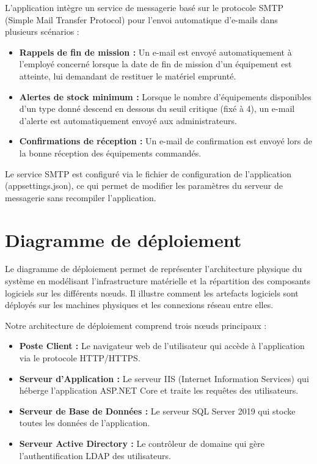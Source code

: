 L'application intègre un service de messagerie basé sur le protocole SMTP (Simple Mail Transfer Protocol) pour l'envoi automatique d'e-mails dans plusieurs scénarios :

\begin{itemize}[label=\textbullet,font=\normalsize]
    \item \textbf{Rappels de fin de mission :} Un e-mail est envoyé automatiquement à l'employé concerné lorsque la date de fin de mission d'un équipement est atteinte, lui demandant de restituer le matériel emprunté.
    \item \textbf{Alertes de stock minimum :} Lorsque le nombre d'équipements disponibles d'un type donné descend en dessous du seuil critique (fixé à 4), un e-mail d'alerte est automatiquement envoyé aux administrateurs.
    \item \textbf{Confirmations de réception :} Un e-mail de confirmation est envoyé lors de la bonne réception des équipements commandés.
\end{itemize}

Le service SMTP est configuré via le fichier de configuration de l'application (appsettings.json), ce qui permet de modifier les paramètres du serveur de messagerie sans recompiler l'application.

\section{Diagramme de déploiement}

Le diagramme de déploiement permet de représenter l'architecture physique du système en modélisant l'infrastructure matérielle et la répartition des composants logiciels sur les différents nœuds. Il illustre comment les artefacts logiciels sont déployés sur les machines physiques et les connexions réseau entre elles.

Notre architecture de déploiement comprend trois nœuds principaux :

\begin{itemize}[label=\textbullet,font=\normalsize]
    \item \textbf{Poste Client :} Le navigateur web de l'utilisateur qui accède à l'application via le protocole HTTP/HTTPS.
    \item \textbf{Serveur d'Application :} Le serveur IIS (Internet Information Services) qui héberge l'application ASP.NET Core et traite les requêtes des utilisateurs.
    \item \textbf{Serveur de Base de Données :} Le serveur SQL Server 2019 qui stocke toutes les données de l'application.
    \item \textbf{Serveur Active Directory :} Le contrôleur de domaine qui gère l'authentification LDAP des utilisateurs.
\end{itemize}


